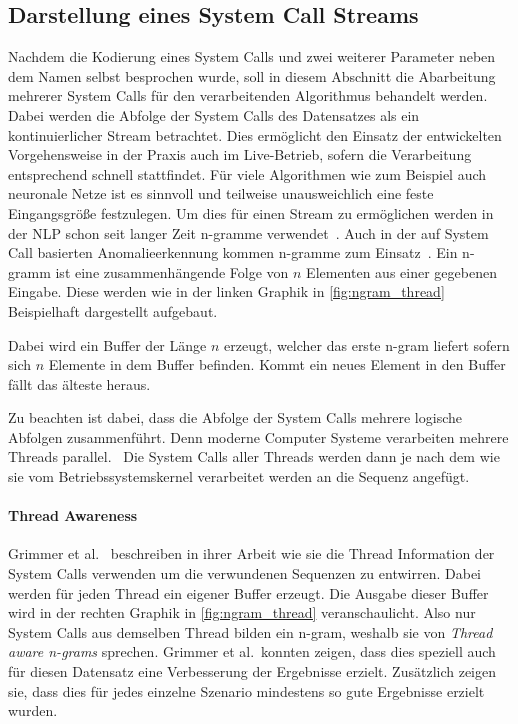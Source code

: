         \subsection{Darstellung eines System Call Streams}\label{sec:streamdarstellung}
            Nachdem die Kodierung eines System Calls und zwei weiterer Parameter neben dem Namen selbst besprochen wurde, soll in diesem Abschnitt die Abarbeitung mehrerer System Calls für den verarbeitenden Algorithmus behandelt werden.
            Dabei werden die Abfolge der System Calls des Datensatzes als ein kontinuierlicher Stream betrachtet.
            Dies ermöglicht den Einsatz der entwickelten Vorgehensweise in der Praxis auch im Live-Betrieb, sofern die Verarbeitung entsprechend schnell stattfindet.
            Für viele Algorithmen wie zum Beispiel auch neuronale Netze ist es sinnvoll und teilweise unausweichlich eine feste Eingangsgröße festzulegen.
            Um dies für einen Stream zu ermöglichen werden in der \ac{NLP} schon seit langer Zeit n-gramme verwendet~\cite{NGRAMSUEN1979}.
            Auch in der auf System Call basierten Anomalieerkennung kommen n-gramme zum Einsatz~\cite{STIDE_Alternatives, SYSCALL_GRAPHS, IDSTHREADGRIMMER2021}.
            Ein n-gramm ist eine zusammenhängende Folge von $n$ Elementen aus einer gegebenen Eingabe.
            Diese werden wie in der linken Graphik in \autoref{fig:ngram_thread} Beispielhaft dargestellt aufgebaut.

            Dabei wird ein Buffer der Länge $n$ erzeugt, welcher das erste n-gram liefert sofern sich $n$ Elemente in dem Buffer befinden.
            Kommt ein neues Element in den Buffer fällt das älteste heraus.

            Zu beachten ist dabei, dass die Abfolge der System Calls mehrere logische Abfolgen zusammenführt.
            Denn moderne Computer Systeme verarbeiten mehrere Threads parallel.~\cite{SYSCALL_SILBERSCHATZ}
            Die System Calls aller Threads werden dann je nach dem wie sie vom Betriebssystemskernel verarbeitet werden an die Sequenz angefügt.
            
            \paragraph{Thread Awareness}
                Grimmer et al.~\cite{IDSTHREADGRIMMER2021} beschreiben in ihrer Arbeit wie sie die Thread Information der System Calls verwenden um die verwundenen Sequenzen zu entwirren.
                Dabei werden für jeden Thread ein eigener Buffer erzeugt. 
                Die Ausgabe dieser Buffer wird in der rechten Graphik in \autoref{fig:ngram_thread} veranschaulicht. 
                Also nur System Calls aus demselben Thread bilden ein n-gram, weshalb sie von \textit{Thread aware n-grams} sprechen.
                Grimmer et al.\ konnten zeigen, dass dies speziell auch für diesen Datensatz eine Verbesserung der Ergebnisse erzielt.
                Zusätzlich zeigen sie, dass dies für jedes einzelne Szenario mindestens so gute Ergebnisse erzielt wurden.

